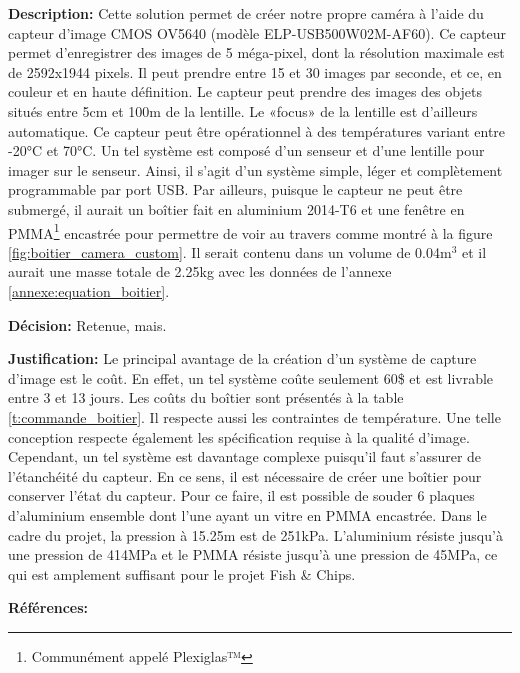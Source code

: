 \textbf{Description:} Cette solution permet de créer notre propre caméra à l'aide du capteur d'image CMOS OV5640 (modèle ELP-USB500W02M-AF60). Ce capteur permet d'enregistrer des images de 5 méga-pixel, dont la résolution maximale est de 2592x1944 pixels. Il peut prendre entre 15 et 30 images par seconde, et ce, en couleur et en haute définition. Le capteur peut prendre des images des objets situés entre 5cm et 100m de la lentille. Le «focus» de la lentille est d'ailleurs automatique. Ce capteur peut être opérationnel à des températures variant entre -20°C et 70°C. Un tel système est composé d'un senseur et d'une lentille pour imager sur le senseur. Ainsi, il s'agit d'un système simple, léger et complètement programmable par port USB. Par ailleurs, puisque le capteur ne peut être submergé, il aurait un boîtier fait en aluminium 2014-T6 et une fenêtre en PMMA\footnote{Communément appelé Plexiglas™} encastrée pour permettre de voir au travers comme montré à la figure \ref{fig:boitier_camera_custom}. Il serait contenu dans un volume de 0.04m$^3$ et il aurait une masse totale de 2.25kg avec les données de l'annexe \ref{annexe:equation_boitier}.

\textbf{Décision:} Retenue, mais.

\textbf{Justification:} Le principal avantage de la création d'un système de capture d'image est le coût. En effet, un tel système coûte seulement 60\$ et est livrable entre 3 et 13 jours. Les coûts du boîtier sont présentés à la table \ref{t:commande_boitier}. Il respecte aussi les contraintes de température. Une telle conception respecte également les spécification requise à la qualité d'image. Cependant, un tel système est davantage complexe puisqu'il faut s'assurer de l'étanchéité du capteur. En ce sens, il est nécessaire de créer une boîtier pour conserver l'état du capteur. Pour ce faire, il est possible de souder 6 plaques d'aluminium ensemble dont l'une ayant un vitre en PMMA encastrée. Dans le cadre du projet, la pression à 15.25m est de 251kPa. L'aluminium résiste jusqu'à une pression de 414MPa et le PMMA résiste jusqu'à une pression de 45MPa, ce qui est amplement suffisant pour le projet Fish \& Chips.

\textbf{Références:} \cite{OV5640} \cite{OV5640_coûts} \cite{ASM} \cite{Glass}

